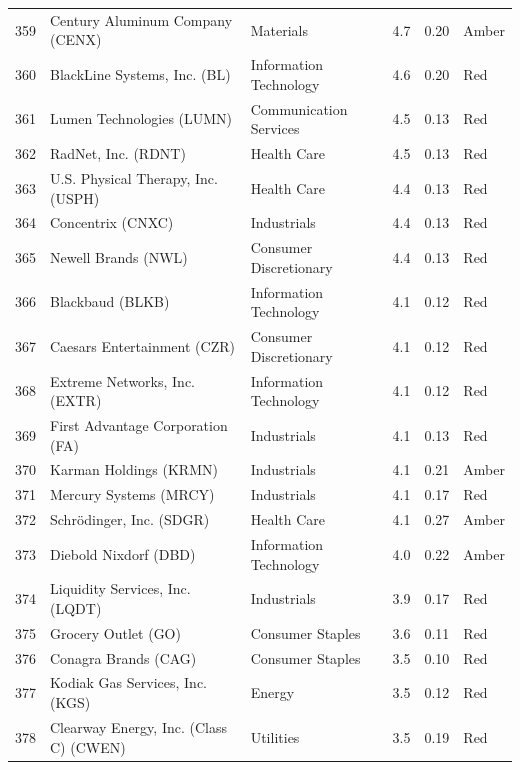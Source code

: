 \documentclass[11pt,a4paper]{article}
\begin{document}
{\begin{longtable}{r p{4.6cm} p{3cm} r r l}
359 & Century Aluminum Company (CENX) & Materials & 4.7 & 0.20 & \cellcolor[HTML]{FFEB9C}Amber \\
360 & BlackLine Systems, Inc. (BL) & Information Technology & 4.6 & 0.20 & \cellcolor[HTML]{F4B6B6}Red \\
361 & Lumen Technologies (LUMN) & Communication Services & 4.5 & 0.13 & \cellcolor[HTML]{F4B6B6}Red \\
362 & RadNet, Inc. (RDNT) & Health Care & 4.5 & 0.13 & \cellcolor[HTML]{F4B6B6}Red \\
363 & U.S. Physical Therapy, Inc. (USPH) & Health Care & 4.4 & 0.13 & \cellcolor[HTML]{F4B6B6}Red \\
364 & Concentrix (CNXC) & Industrials & 4.4 & 0.13 & \cellcolor[HTML]{F4B6B6}Red \\
365 & Newell Brands (NWL) & Consumer Discretionary & 4.4 & 0.13 & \cellcolor[HTML]{F4B6B6}Red \\
366 & Blackbaud (BLKB) & Information Technology & 4.1 & 0.12 & \cellcolor[HTML]{F4B6B6}Red \\
367 & Caesars Entertainment (CZR) & Consumer Discretionary & 4.1 & 0.12 & \cellcolor[HTML]{F4B6B6}Red \\
368 & Extreme Networks, Inc. (EXTR) & Information Technology & 4.1 & 0.12 & \cellcolor[HTML]{F4B6B6}Red \\
369 & First Advantage Corporation (FA) & Industrials & 4.1 & 0.13 & \cellcolor[HTML]{F4B6B6}Red \\
370 & Karman Holdings (KRMN) & Industrials & 4.1 & 0.21 & \cellcolor[HTML]{FFEB9C}Amber \\
371 & Mercury Systems (MRCY) & Industrials & 4.1 & 0.17 & \cellcolor[HTML]{F4B6B6}Red \\
372 & Schrödinger, Inc. (SDGR) & Health Care & 4.1 & 0.27 & \cellcolor[HTML]{FFEB9C}Amber \\
373 & Diebold Nixdorf (DBD) & Information Technology & 4.0 & 0.22 & \cellcolor[HTML]{FFEB9C}Amber \\
374 & Liquidity Services, Inc. (LQDT) & Industrials & 3.9 & 0.17 & \cellcolor[HTML]{F4B6B6}Red \\
375 & Grocery Outlet (GO) & Consumer Staples & 3.6 & 0.11 & \cellcolor[HTML]{F4B6B6}Red \\
376 & Conagra Brands (CAG) & Consumer Staples & 3.5 & 0.10 & \cellcolor[HTML]{F4B6B6}Red \\
377 & Kodiak Gas Services, Inc. (KGS) & Energy & 3.5 & 0.12 & \cellcolor[HTML]{F4B6B6}Red \\
378 & Clearway Energy, Inc. (Class C) (CWEN) & Utilities & 3.5 & 0.19 & \cellcolor[HTML]{F4B6B6}Red \\

\end{longtable}}
\end{document}
